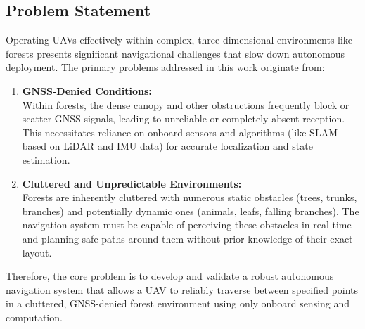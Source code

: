         \subsection{Problem Statement}
            Operating \ac{UAV}s effectively within complex, three-dimensional environments like forests presents significant navigational challenges that slow down autonomous deployment. 
            The primary problems addressed in this work originate from:
            \begin{enumerate}
                \item \textbf{\ac{GNSS}-Denied Conditions: } \\
                Within forests, the dense canopy and other obstructions frequently block or scatter \ac{GNSS} signals, leading to unreliable or completely absent reception.
                This necessitates reliance on onboard sensors and algorithms (like \ac{SLAM} based on \ac{LiDAR} and \ac{IMU} data) for accurate localization and state estimation.
                \item \textbf{Cluttered and Unpredictable Environments: } \\
                Forests are inherently cluttered with numerous static obstacles (trees, trunks, branches) and potentially dynamic ones (animals, leafs, falling branches). 
                The navigation system must be capable of perceiving these obstacles in real-time and planning safe paths around them without prior knowledge of their exact layout.
            \end{enumerate}
            Therefore, the core problem is to develop and validate a robust autonomous navigation system that allows a \ac{UAV} to reliably traverse between specified points in a cluttered, GNSS-denied forest environment using only onboard sensing and computation.

